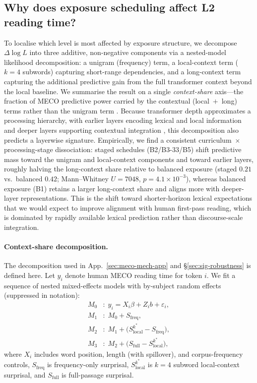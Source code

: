 \subsection{Why does exposure scheduling affect L2 reading time?} \label{sec:reading-time-stage}  
 To localise which level is most affected by exposure structure, we decompose $\Delta\log L$ into three additive, non-negative components via a nested-model likelihood decomposition: a unigram (frequency) term, a local-context term ($k{=}4$ subwords) capturing short-range dependencies, and a long-context term capturing the additional predictive gain from the full transformer context beyond the local baseline. We summarise the result on a single \emph{context-share} axis---the fraction of MECO predictive power carried by the contextual (local~$+$~long) terms rather than the unigram term . Because transformer depth approximates a processing hierarchy, with earlier layers encoding lexical and local information and deeper layers supporting contextual integration \citep{kuribayashi2026dual}, this decomposition also predicts a layerwise signature. Empirically, we find a consistent curriculum~$\times$ processing-stage dissociation: staged schedules (B2/B3-33/B5) shift predictive mass toward the unigram and local-context components and toward earlier layers, roughly halving the long-context share relative to balanced exposure (staged $0.21$ vs.\ balanced $0.42$; Mann--Whitney $U{=}7048$, $p{=}4.1{\times}10^{-3}$), whereas balanced exposure (B1) retains a larger long-context share and aligns more with deeper-layer representations. This is the shift toward shorter-horizon lexical expectations that we would expect to improve alignment with human first-pass reading, which is dominated by rapidly available lexical prediction rather than discourse-scale integration.
 
 
\paragraph{Context-share decomposition.}
The decomposition used in App.~\ref{sec:meco-mech-app} and \S\ref{sec:sig-robustness} is defined here. Let $y_i$ denote human MECO reading time for token $i$. We fit a sequence of nested mixed-effects models with by-subject random effects (suppressed in notation):
\begin{align*}
M_0 &: \; y_i = X_i \beta + Z_i b + \varepsilon_i, \\
M_1 &: \; M_0 + S_{\mathrm{freq}}, \\
M_2 &: \; M_1 + \big(S_{\mathrm{local}}^{k^*} - S_{\mathrm{freq}}\big), \\
M_3 &: \; M_2 + \big(S_{\mathrm{full}} - S_{\mathrm{local}}^{k^*}\big),
\end{align*}
where $X_i$ includes word position, length (with spillover), and corpus-frequency controls, $S_{\mathrm{freq}}$ is frequency-only surprisal, $S_{\mathrm{local}}^{k^*}$ is $k{=}4$ subword local-context surprisal, and $S_{\mathrm{full}}$ is full-passage surprisal.
 
